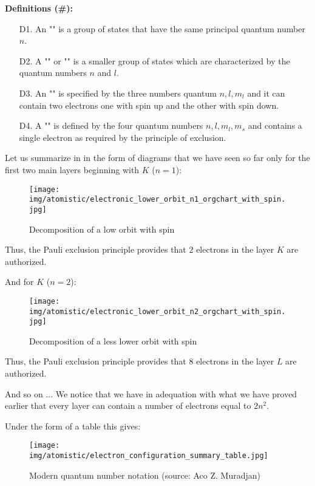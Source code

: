 	\textbf{Definitions (\#\mydef):}
	 \begin{enumerate}
		\item[D1.] An "" is a group of states that have the same principal quantum number $n$.

		\item[D2.] A "" or "" is a smaller group of states which are characterized by the quantum numbers $n$ and $l$.

		\item[D3.] An "" is specified by the three numbers quantum $n,l,m_l$ and it can contain two electrons one with spin up and the other with spin down.

		\item[D4.] A "" is defined by the four quantum numbers $n,l,m_l,m_s$ and contains a single electron as required by the principle of exclusion.
	\end{enumerate}
	Let us summarize in in the form of diagrams that we have seen so far only for the first two main layers beginning with $K$ ($n=1$):
	\begin{figure}[H]
		\centering
		\texttt{[image: img/atomistic/electronic\_lower\_orbit\_n1\_orgchart\_with\_spin.jpg]}
		\caption{Decomposition of a low orbit with spin}
	\end{figure}
	Thus, the Pauli exclusion principle provides that  $2$ electrons in the layer $K$ are authorized.

	And for $K$ ($n=2$):
	\begin{figure}[H]
		\centering
		\texttt{[image: img/atomistic/electronic\_lower\_orbit\_n2\_orgchart\_with\_spin.jpg]}
		\caption{Decomposition of a less lower orbit with spin}
	\end{figure}
	Thus, the Pauli exclusion principle provides that  $8$ electrons in the layer $L$ are authorized.
	
	And so on ... We notice that we have in adequation with what we have proved earlier that every layer can contain a number of electrons equal to $2n^2$.
	
	Under the form of a table this gives:
	\begin{figure}[H]
		\centering
		\texttt{[image: img/atomistic/electron\_configuration\_summary\_table.jpg]}
		\caption{Modern quantum number notation (source: Aco Z. Muradjan)}
	\end{figure}


